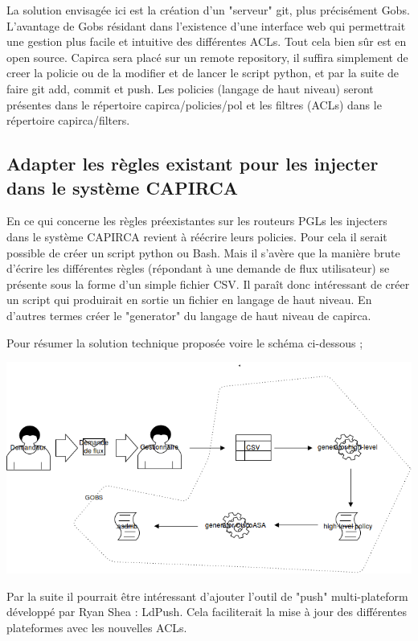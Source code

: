 \documentclass{article}
\begin{document}
La solution envisagée ici est la création d’un "serveur" git, plus précisément Gobs. L’avantage de Gobs résidant dans l’existence d’une interface web qui permettrait une gestion plus facile et intuitive des différentes ACLs. Tout cela bien sûr est en open source. Capirca sera placé sur un remote repository, il suffira simplement de creer la policie ou de la modifier et de lancer le script python, et par la suite de faire git add, commit et push. Les policies (langage de haut niveau) seront présentes dans le répertoire capirca/policies/pol et les filtres (ACLs) dans le répertoire capirca/filters. 

\maketitle
\subsection{Adapter les règles existant pour les injecter dans le système CAPIRCA}

En ce qui concerne les règles préexistantes sur les routeurs PGLs les injecters dans le système CAPIRCA revient à réécrire leurs policies. Pour cela il serait possible de créer un script python ou Bash. Mais il s’avère que la manière brute d’écrire les différentes règles (répondant à une demande de flux utilisateur) se présente sous la forme d’un simple fichier CSV. Il paraît donc intéressant de créer un script qui produirait en sortie un fichier en langage de haut niveau. En d’autres termes créer le "generator" du langage de haut niveau de capirca.

Pour résumer la solution technique proposée voire le schéma ci-dessous ;

\centerline{\includegraphics[scale=0.4]{spec.png}}

Par la suite il pourrait être intéressant d'ajouter l'outil de "push" multi-plateform développé par Ryan Shea : LdPush. Cela faciliterait la mise à jour des différentes plateformes avec les nouvelles ACLs.
\end{document}

